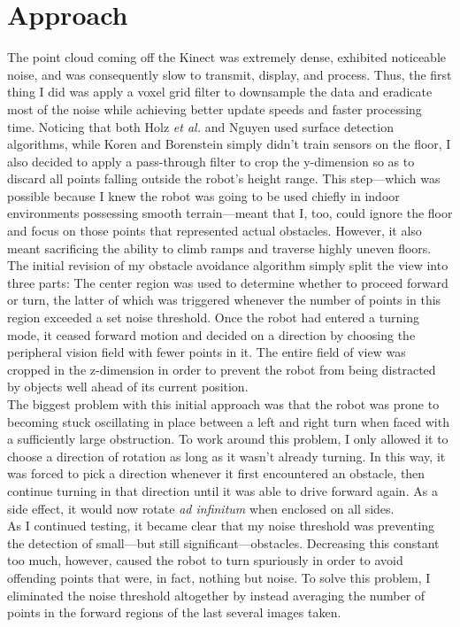 \documentclass[12pt]{report}
\begin{document}
\section{Approach}
The point cloud coming off the Kinect was extremely dense, exhibited noticeable noise, and was consequently slow to transmit, display, and process.  Thus, the first thing I did was apply a voxel grid filter to downsample the data and eradicate most of the noise while achieving better update speeds and faster processing time.  Noticing that both Holz \textit{et al.} and Nguyen used surface detection algorithms, while Koren and Borenstein simply didn't train sensors on the floor, I also decided to apply a pass-through filter to crop the y-dimension so as to discard all points falling outside the robot's height range.  This step---which was possible because I knew the robot was going to be used chiefly in indoor environments possessing smooth terrain---meant that I, too, could ignore the floor and focus on those points that represented actual obstacles.  However, it also meant sacrificing the ability to climb ramps and traverse highly uneven floors. \\
The initial revision of my obstacle avoidance algorithm simply split the view into three parts:  The center region was used to determine whether to proceed forward or turn, the latter of which was triggered whenever the number of points in this region exceeded a set noise threshold.  Once the robot had entered a turning mode, it ceased forward motion and decided on a direction by choosing the peripheral vision field with fewer points in it.  The entire field of view was cropped in the z-dimension in order to prevent the robot from being distracted by objects well ahead of its current position. \\
The biggest problem with this initial approach was that the robot was prone to becoming stuck oscillating in place between a left and right turn when faced with a sufficiently large obstruction.  To work around this problem, I only allowed it to choose a direction of rotation as long as it wasn't already turning.  In this way, it was forced to pick a direction whenever it first encountered an obstacle, then continue turning in that direction until it was able to drive forward again.  As a side effect, it would now rotate \textit{ad infinitum} when enclosed on all sides. \\
As I continued testing, it became clear that my noise threshold was preventing the detection of small---but still significant---obstacles.  Decreasing this constant too much, however, caused the robot to turn spuriously in order to avoid offending points that were, in fact, nothing but noise.  To solve this problem, I eliminated the noise threshold altogether by instead averaging the number of points in the forward regions of the last several images taken. \\
\end{document}
